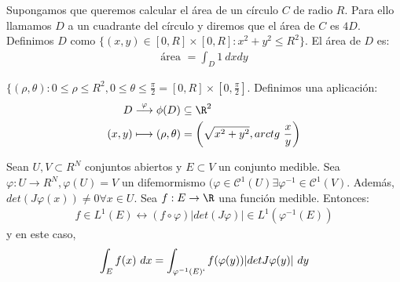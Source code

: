 \begin{ejemplo} \hfill

\begin{minipage}[b]{0.55\textwidth}
  Supongamos que queremos calcular el área de un círculo $C$ de radio $R$. Para ello
  llamamos $D$ a un cuadrante del círculo y diremos que el área de $C$ es
  $4D$. Definimos $D$ como $\{ (x, y) \in [0, R] \times [0, R] : x^2 + y^2 \leq
  R^2 \}$. El área de $D$ es:
  \begin{align*}
    \text{área } = \int_D 1 \ dxdy
  \end{align*}
\end{minipage} \hfill
\begin{minipage}[b]{0.35\textwidth}
\end{minipage}

  $\{ (\rho, \theta) : 0 \leq \rho \leq R^2, 0 \leq \theta \leq
  \frac{\pi}{2} = [0, R] \times [0, \frac{\pi}{2}]$. Definimos una aplicación:
  \begin{align*}
    D &\overset{\varphi}{\longrightarrow} \phi(D) \subseteq \R^2 \\
    (x,y) &\longmapsto (\rho, \theta) = \left(\sqrt{x^2+y^2}, arctg \ \frac{x}{y} \right)
  \end{align*}
\end{ejemplo}

\begin{nth}
  Sean $U, V \subset R^N$ conjuntos abiertos y $E \subset V$ un conjunto medible. Sea $\varphi : U \rightarrow R^N, \varphi(U)
  = V$ un difemormismo $(\varphi \in \mathcal C^1 (U) \exists \varphi^{-1} \in
  \mathcal C^1 (V)$. Además, $det(J \varphi (x)) \neq 0 \forall x \in U$. Sea $f
  : E \rightarrow \R$ una función medible. Entonces:
  \begin{align*}
    f \in L^1(E) \leftrightarrow (f \circ \varphi) |det (J\varphi)| \in L^1(\varphi^{-1}(E))
  \end{align*}
y en este caso,
\begin{align*}
  \int_E f(x) \ dx = \int_{\varphi^{-1}(E)`} f (\varphi(y)) |det J \varphi (y)| \ dy
\end{align*}
\end{nth}

